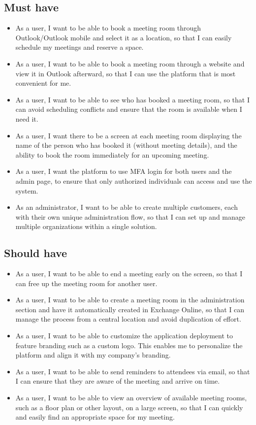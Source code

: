 \subsection{Must have}
\begin{itemize}
\item As a user, I want to be able to book a meeting room through Outlook/Outlook mobile and select it as a location, so that I can easily schedule my meetings and reserve a space.
\item As a user, I want to be able to book a meeting room through a website and view it in Outlook afterward, so that I can use the platform that is most convenient for me.
\item As a user, I want to be able to see who has booked a meeting room, so that I can avoid scheduling conflicts and ensure that the room is available when I need it.
\item As a user, I want there to be a screen at each meeting room displaying the name of the person who has booked it (without meeting details), and the ability to book the room immediately for an upcoming meeting.
\item As a user, I want the platform to use MFA login for both users and the admin page, to ensure that only authorized individuals can access and use the system.
\item As an administrator, I want to be able to create multiple customers, each with their own unique administration flow, so that I can set up and manage multiple organizations within a single solution. %
\end{itemize}


\subsection{Should have}
\begin{itemize}
\item As a user, I want to be able to end a meeting early on the screen, so that I can free up the meeting room for another user.
\item As a user, I want to be able to create a meeting room in the administration section and have it automatically created in Exchange Online, so that I can manage the process from a central location and avoid duplication of effort.
\item As a user, I want to be able to customize the application deployment to feature branding such as a custom logo. This enables me to personalize the platform and align it with my company's branding.
\item As a user, I want to be able to send reminders to attendees via email, so that I can ensure that they are aware of the meeting and arrive on time.
\item As a user, I want to be able to view an overview of available meeting rooms, such as a floor plan or other layout, on a large screen, so that I can quickly and easily find an appropriate space for my meeting.
\end{itemize}

